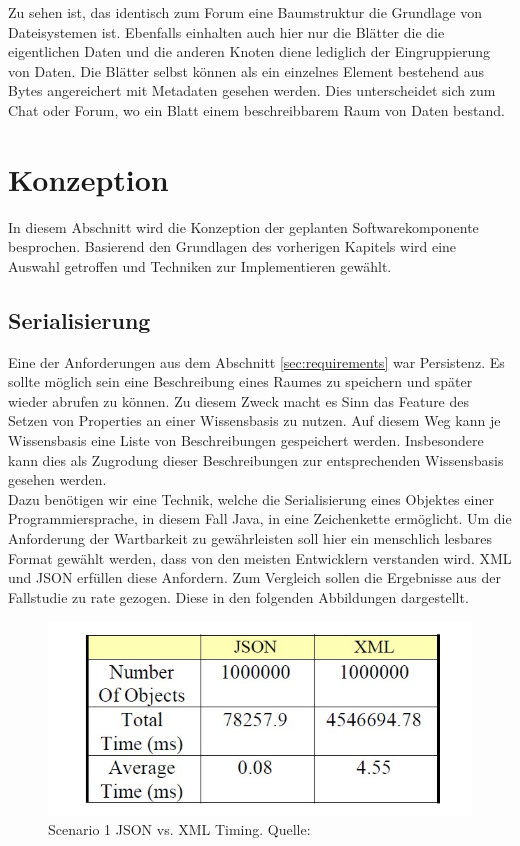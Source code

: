 \documentclass[a4paper]{article}
\begin{document}
	Zu sehen ist, das identisch zum Forum eine Baumstruktur die Grundlage von
	Dateisystemen ist. Ebenfalls einhalten auch hier nur die Blätter die
	die eigentlichen Daten und die anderen Knoten diene lediglich
	der Eingruppierung von Daten. Die Blätter selbst können als ein einzelnes
	Element bestehend aus Bytes angereichert mit Metadaten gesehen werden.
	Dies unterscheidet sich zum Chat oder Forum, wo ein Blatt einem beschreibbarem
	Raum von Daten bestand. 
		
	\newpage
	
	\section{Konzeption}	
	
	In diesem Abschnitt wird die Konzeption der geplanten Softwarekomponente
	besprochen. Basierend den Grundlagen des vorherigen Kapitels wird eine
	Auswahl getroffen und Techniken zur Implementieren gewählt.
	
	\subsection{Serialisierung}
	
	Eine der Anforderungen aus dem Abschnitt \ref{sec:requirements} war Persistenz.
	Es sollte möglich sein eine Beschreibung eines Raumes zu speichern und später
	wieder abrufen zu können. Zu diesem Zweck macht es Sinn das Feature des Setzen
	von Properties an einer Wissensbasis zu nutzen. Auf diesem Weg kann je 
	Wissensbasis eine Liste von Beschreibungen gespeichert werden. Insbesondere
	kann dies als Zugrodung dieser Beschreibungen zur entsprechenden Wissensbasis
	gesehen werden. \\
	
	Dazu benötigen wir eine Technik, welche die Serialisierung eines Objektes einer
	Programmiersprache, in diesem Fall Java, in eine Zeichenkette ermöglicht. Um
	die Anforderung der Wartbarkeit zu gewährleisten soll hier ein menschlich
	lesbares Format gewählt werden, dass von den meisten Entwicklern verstanden
	wird. XML und JSON erfüllen diese Anfordern. Zum Vergleich sollen die
	Ergebnisse aus der Fallstudie \cite{XmlJson} zu rate gezogen. Diese in den
	folgenden Abbildungen dargestellt.
	
	\begin{figure}[H] 
		\includegraphics[width=\linewidth]{../Bilder/xml_json_time_sen1.jpg}
		\caption{Scenario 1 JSON vs. XML Timing. Quelle: \cite{XmlJson}}
		\label{fig:xml_json_time_sen1}
	\end{figure}
	
\end{document}
